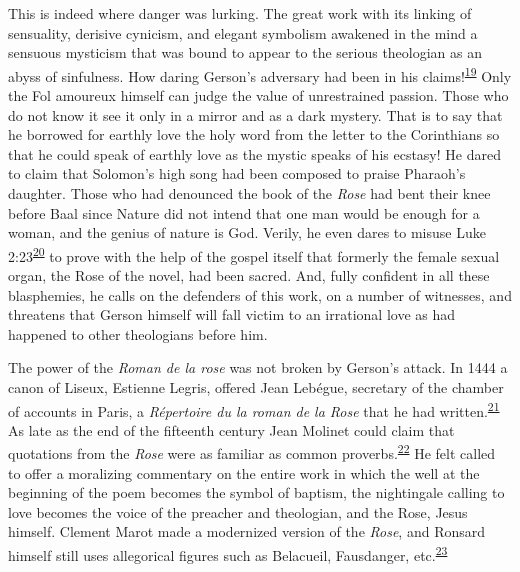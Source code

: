 This is indeed where danger was lurking. The great work with its linking
of sensuality, derisive cynicism, and elegant symbolism awakened in the
mind a sensuous mysticism that was bound to appear to the serious
theologian as an abyss of sinfulness. How daring Gerson's adversary had
been in his
claims!\textsuperscript{\protect\hypertarget{11_Chapter_Four__THE_FORMS_OF_LOVE.xhtmlux5cux23id_1450}{\protect\hyperlink{23_NOTES.xhtmlux5cux23id_1451}{19}}}
Only the Fol amoureux himself can judge the value of unrestrained
passion. Those who do not know it see it only in a mirror and as a dark
mystery. That is to say that he borrowed for earthly love the holy word
from the letter to the Corinthians so that he could speak of earthly
love as the mystic speaks of his ecstasy! He dared to claim that
Solomon's high song had been composed to praise Pharaoh's daughter.
Those who had denounced the book of the \emph{Rose} had bent their knee
before Baal since Nature did not intend that one man would be enough for
a woman, and the genius of nature is God. Verily, he even dares to
misuse Luke
2:23\textsuperscript{\protect\hypertarget{11_Chapter_Four__THE_FORMS_OF_LOVE.xhtmlux5cux23id_1448}{\protect\hyperlink{23_NOTES.xhtmlux5cux23id_1449}{20}}}
to prove with the help of the gospel itself that formerly the female
sexual organ, the Rose of the novel, had been sacred. And, fully
confident in all these blasphemies, he calls on the defenders of this
work, on a number of witnesses, and threatens that Gerson himself will
fall victim to an irrational love as had happened to other theologians
before him.

\protect\hypertarget{11_Chapter_Four__THE_FORMS_OF_LOVE.xhtmlux5cux23page_140}{}{}The
power of the \emph{Roman de la rose} was not broken by Gerson's attack.
In 1444 a canon of Liseux, Estienne Legris, offered Jean Lebégue,
secretary of the chamber of accounts in Paris, a \emph{Répertoire du la
roman de la Rose} that he had
written.\textsuperscript{\protect\hypertarget{11_Chapter_Four__THE_FORMS_OF_LOVE.xhtmlux5cux23id_1446}{\protect\hyperlink{23_NOTES.xhtmlux5cux23id_1447}{21}}}
As late as the end of the fifteenth century Jean Molinet could claim
that quotations from the \emph{Rose} were as familiar as common
proverbs.\textsuperscript{\protect\hypertarget{11_Chapter_Four__THE_FORMS_OF_LOVE.xhtmlux5cux23id_1444}{\protect\hyperlink{23_NOTES.xhtmlux5cux23id_1445}{22}}}
He felt called to offer a moralizing commentary on the entire work in
which the well at the beginning of the poem becomes the symbol of
baptism, the nightingale calling to love becomes the voice of the
preacher and theologian, and the Rose, Jesus himself. Clement Marot made
a modernized version of the \emph{Rose}, and Ronsard himself still uses
allegorical figures such as Belacueil, Fausdanger,
etc.\textsuperscript{\protect\hypertarget{11_Chapter_Four__THE_FORMS_OF_LOVE.xhtmlux5cux23id_1442}{\protect\hyperlink{23_NOTES.xhtmlux5cux23id_1443}{23}}}

